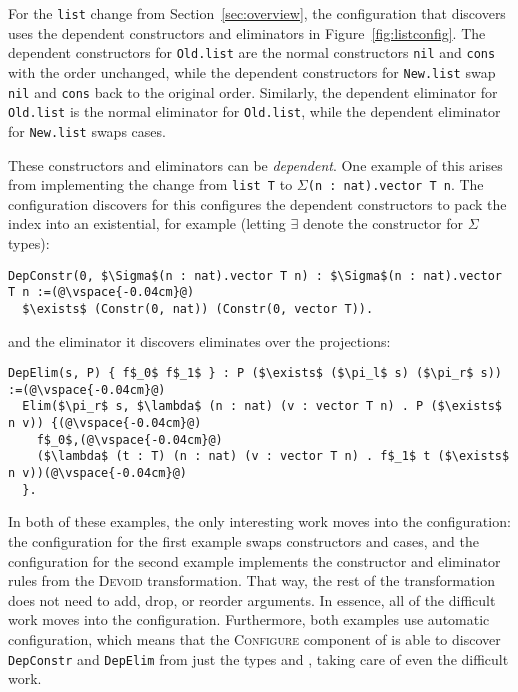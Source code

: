 For the \lstinline{list} change from Section~\ref{sec:overview},
the configuration that \toolname discovers uses the dependent constructors
and eliminators in Figure~\ref{fig:listconfig}. The dependent constructors for \lstinline{Old.list}
are the normal constructors \lstinline{nil} and \lstinline{cons} with the order unchanged,
while the dependent constructors for \lstinline{New.list} swap \lstinline{nil} and \lstinline{cons}
back to the original order.
Similarly, the dependent eliminator for \lstinline{Old.list} is the normal eliminator for \lstinline{Old.list},
while the dependent eliminator for \lstinline{New.list} swaps cases.

These constructors and eliminators can be \textit{dependent}.
One example of this arises from implementing the change from \lstinline{list T} to $\Sigma$\lstinline{(n : nat).vector T n}.
The configuration \toolname discovers for this configures the dependent constructors to pack the index into an existential, for example (letting $\exists$ denote the constructor for $\Sigma$ types):

\begin{lstlisting}
DepConstr(0, $\Sigma$(n : nat).vector T n) : $\Sigma$(n : nat).vector T n :=(@\vspace{-0.04cm}@)
  $\exists$ (Constr(0, nat)) (Constr(0, vector T)).
\end{lstlisting}
and the eliminator it discovers eliminates over the projections:

\begin{lstlisting}
DepElim(s, P) { f$_0$ f$_1$ } : P ($\exists$ ($\pi_l$ s) ($\pi_r$ s)) :=(@\vspace{-0.04cm}@)
  Elim($\pi_r$ s, $\lambda$ (n : nat) (v : vector T n) . P ($\exists$ n v)) {(@\vspace{-0.04cm}@)
    f$_0$,(@\vspace{-0.04cm}@)
    ($\lambda$ (t : T) (n : nat) (v : vector T n) . f$_1$ t ($\exists$ n v))(@\vspace{-0.04cm}@)
  }. 
\end{lstlisting}

In both of these examples, the only interesting work moves into the configuration:
the configuration for the first example swaps constructors and cases,
and the configuration for the second example implements the constructor and eliminator rules from the \textsc{Devoid} transformation.
That way, the rest of the \toolname transformation does not need to add, drop, or reorder arguments.
In essence, all of the difficult work moves into the configuration.
Furthermore, both examples use automatic configuration, which means that the \textsc{Configure} component of \toolname is able to 
discover \lstinline{DepConstr} and \lstinline{DepElim} from just the types \A and \B, taking care of even the difficult work.

